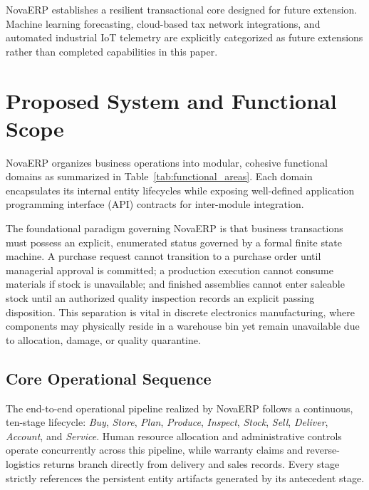 \documentclass[conference]{IEEEtran}
\begin{document}
NovaERP establishes a resilient transactional core designed for future extension. Machine learning forecasting, cloud-based tax network integrations, and automated industrial IoT telemetry are explicitly categorized as future extensions rather than completed capabilities in this paper.

\section{Proposed System and Functional Scope}
NovaERP organizes business operations into modular, cohesive functional domains as summarized in Table~\ref{tab:functional_areas}. Each domain encapsulates its internal entity lifecycles while exposing well-defined application programming interface (API) contracts for inter-module integration.

The foundational paradigm governing NovaERP is that business transactions must possess an explicit, enumerated status governed by a formal finite state machine. A purchase request cannot transition to a purchase order until managerial approval is committed; a production execution cannot consume materials if stock is unavailable; and finished assemblies cannot enter saleable stock until an authorized quality inspection records an explicit passing disposition. This separation is vital in discrete electronics manufacturing, where components may physically reside in a warehouse bin yet remain unavailable due to allocation, damage, or quality quarantine.

\subsection{Core Operational Sequence}
The end-to-end operational pipeline realized by NovaERP follows a continuous, ten-stage lifecycle: \textit{Buy}, \textit{Store}, \textit{Plan}, \textit{Produce}, \textit{Inspect}, \textit{Stock}, \textit{Sell}, \textit{Deliver}, \textit{Account}, and \textit{Service}. Human resource allocation and administrative controls operate concurrently across this pipeline, while warranty claims and reverse-logistics returns branch directly from delivery and sales records. Every stage strictly references the persistent entity artifacts generated by its antecedent stage.

\end{document}
